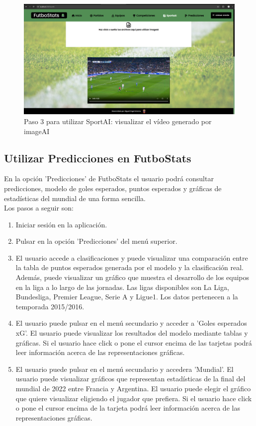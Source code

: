 \begin{figure}[H]
    \centering
    \includegraphics[width=1\linewidth]{img/sportsAI3-UM.png}
    \caption{Paso 3 para utilizar SportAI: visualizar el vídeo generado por imageAI}
    \label{fig:enter-label}
\end{figure}

\subsection{Utilizar Predicciones en FutboStats}
En la opción 'Predicciones' de FutboStats el usuario podrá consultar predicciones, modelo de goles esperados, puntos esperados y gráficas de estadísticas del mundial de una forma sencilla. \\
Los pasos a seguir son:
\begin{enumerate}
    \item Iniciar sesión en la aplicación.
    \item Pulsar en la opción 'Predicciones' del menú superior.
    \item El usuario accede a clasificaciones y puede visualizar una comparación entre la tabla de puntos esperados generada por el modelo y la clasificación real. Además, puede visualizar un gráfico que muestra el desarrollo de los equipos en la liga a lo largo de las jornadas. Las ligas disponibles son La Liga, Bundesliga, Premier League, Serie A y Ligue1. Los datos pertenecen a la temporada 2015/2016.
    \item El usuario puede pulsar en el menú secundario y acceder a 'Goles esperados xG'. El usuario puede visualizar los resultados del modelo mediante tablas y gráficas. Si el usuario hace click o pone el cursor encima de las tarjetas podrá leer información acerca de las representaciones gráficas.
    \item El usuario puede pulsar en el menú secundario y accedera 'Mundial'. El usuario puede visualizar gráficos que representan estadísticas de la final del mundial de 2022 entre Francia y Argentina. El usuario puede elegir el gráfico que quiere visualizar eligiendo el jugador que prefiera. Si el usuario hace click o pone el cursor encima de la tarjeta podrá leer información acerca de las representaciones gráficas.
\end{enumerate}

